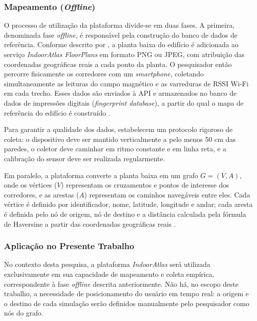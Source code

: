 \documentclass[
    12pt,                %
    openright,           %
    oneside,             %
    a4paper,             %
    english,             %
    brazil               %
]{abntex2}
\begin{document}
\subsubsection*{Mapeamento (\textit{Offline})}

O processo de utilização da plataforma divide-se em duas fases. A primeira, denominada
fase \textit{offline}, é responsável pela construção do banco de dados de referência.
Conforme descrito por , a planta baixa do edifício é adicionada
ao serviço \textit{IndoorAtlas FloorPlans} em formato PNG ou JPEG, com atribuição das
coordenadas geográficas reais a cada ponto da planta. O pesquisador então percorre
fisicamente os corredores com um \textit{smartphone}, coletando simultaneamente as leituras
do campo magnético e as varreduras de RSSI Wi-Fi em cada trecho. Esses dados são enviados
à API e armazenados no banco de dados de impressões digitais (\textit{fingerprint database}),
a partir do qual o mapa de referência do edifício é construído \cite{Stancel2021}.

Para garantir a qualidade dos dados,  estabelecem um protocolo
rigoroso de coleta: o dispositivo deve ser mantido verticalmente a pelo menos 50 cm das
paredes, o coletor deve caminhar em ritmo constante e em linha reta, e a calibração do
sensor deve ser realizada regularmente.

Em paralelo, a plataforma converte a planta baixa em um grafo $G = (V, A)$, onde os
vértices ($V$) representam os cruzamentos e pontos de interesse dos corredores, e as
arestas ($A$) representam os caminhos navegáveis entre eles. Cada vértice é definido por
identificador, nome, latitude, longitude e andar; cada aresta é definida pelo nó de origem,
nó de destino e a distância calculada pela fórmula de Haversine a partir das coordenadas
geográficas reais \cite{Stancel2021}.

\subsubsection*{Aplicação no Presente Trabalho}

No contexto desta pesquisa, a plataforma \textit{IndoorAtlas} será utilizada
exclusivamente em sua capacidade de mapeamento e coleta empírica, correspondente
à fase \textit{offline} descrita anteriormente. Não há, no escopo deste trabalho,
a necessidade de posicionamento do usuário em tempo real: a origem e o destino de
cada simulação serão definidos manualmente pelo pesquisador como nós do grafo.
\end{document}
